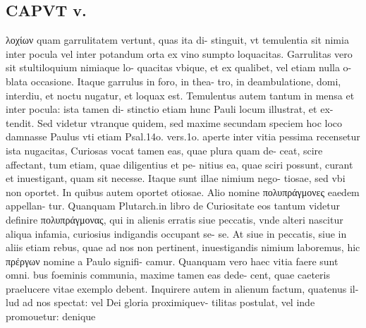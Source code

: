 \documentclass{article}
\begin{document}
\begin{pages}
\section*{CAPVT  v. }
\marginpar{[ p.287 ]}
\marginpar{[ p.0 ]}\pstart λοχίων quam garrulitatem vertunt, quas ita di- stinguit, vt temulentia sit nimia inter pocula vel inter potandum orta ex vino sumpto loquacitas. Garrulitas vero sit stultiloquium nimiaque lo- quacitas vbique, et ex qualibet, vel etiam nulla o- blata occasione. Itaque garrulus in foro, in thea- tro, in deambulatione, domi, interdiu, et noctu nugatur, et loquax est. Temulentus autem tantum in mensa et inter pocula: ista tamen di- stinctio etiam hunc Pauli locum illustrat, et ex- tendit. Sed videtur vtranque quidem, sed maxime secundam speciem hoc loco damnasse Paulus vti etiam Psal.14o. vers.1o. aperte inter vitia pessima recensetur ista nugacitas, Curiosas vocat tamen eas, quae plura quam de- ceat, scire affectant, tum etiam, quae diligentius et pe- nitius ea, quae sciri possunt, curant et inuestigant, quam sit necesse. Itaque sunt illae nimium nego- tiosae, sed vbi non oportet. In quibus autem oportet otiosae. Alio nomine πολυπράγμονες eaedem appellan- tur. Quanquam Plutarch.in libro de Curiositate eos tantum videtur definire πολυπράγμονας, qui in alienis erratis siue peccatis, vnde alteri nascitur aliqua infamia, curiosius indigandis occupant se- se. At siue in peccatis, siue in aliis etiam rebus, quae ad nos non pertinent, inuestigandis nimium laboremus, hic πρέργων nomine a Paulo signifi- camur. Quanquam vero haec vitia faere sunt omni. bus foeminis communia, maxime tamen eas dede- cent, quae caeteris praelucere vitae exemplo debent. Inquirere autem in alienum factum, quatenus il- lud ad nos spectat: vel Dei gloria proximiquev- tilitas postulat, vel inde promouetur: denique  \pend

\end{pages}
\end{document}
